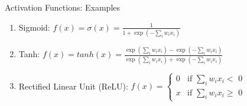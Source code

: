 \documentclass[handout]{beamer}
\begin{document}
\begin{frame}{Activation Functions: Examples}


\begin{enumerate}

  \item Sigmoid: $ f(x) = \sigma(x) = \frac{1}{1+\exp(-\sum_i w_i x_i)}$ \\

  \item Tanh: $ f(x) = tanh(x) = \frac{\exp(\sum_i w_i x_i) - \exp(-\sum_i w_i x_i)}{\exp(\sum_i w_i x_i) + \exp(-\sum_i w_i x_i)}$ \\

  \item Rectified Linear Unit (ReLU): $f(x) = \left\{\begin{array}{ll}
      0 & \mbox{if } \sum_i w_i x_i < \mbox{ 0} \\
      x & \mbox{if } \sum_i w_i x_i \geq \mbox{ 0}
      \end{array}$ \\
\end{enumerate}

\vspace{0.5cm}


\end{frame}
\end{document}
